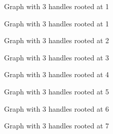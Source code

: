 \documentclass[xcolor=dvipsnames]{beamer}
\numberwithin{equation}{section} \DeclareMathOperator{\Var}{Var}
\begin{document}
\begin{frame}{Graph with 3 handles rooted at 1}

\end{frame}

\begin{frame}{Graph with 3 handles rooted at 1}

\end{frame}

\begin{frame}{Graph with 3 handles rooted at 2}

\end{frame}

\begin{frame}{Graph with 3 handles rooted at 3}

\end{frame}

\begin{frame}{Graph with 3 handles rooted at 4}

\end{frame}

\begin{frame}{Graph with 3 handles rooted at 5}

\end{frame}

\begin{frame}{Graph with 3 handles rooted at 6}

\end{frame}

\begin{frame}{Graph with 3 handles rooted at 7}

\end{frame}
\end{document}
